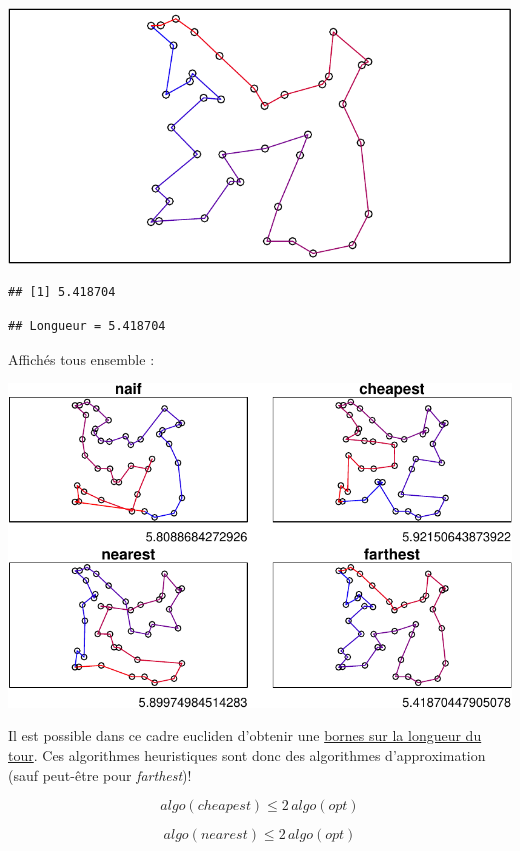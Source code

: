\documentclass[
]{article}
\begin{document}
\includegraphics{TSP_analyse_files/figure-latex/unnamed-chunk-11-1.pdf}

\begin{verbatim}
## [1] 5.418704
\end{verbatim}

\begin{verbatim}
## Longueur = 5.418704
\end{verbatim}

Affichés tous ensemble :

\includegraphics{TSP_analyse_files/figure-latex/unnamed-chunk-12-1.pdf}

Il est possible dans ce cadre eucliden d'obtenir une
\href{https://www.researchgate.net/publication/220616869_An_Analysis_of_Several_Heuristics_for_the_Traveling_Salesman_Problem}{bornes
sur la longueur du tour}. Ces algorithmes heuristiques sont donc des
algorithmes d'approximation (sauf peut-être pour \emph{farthest})!

\[algo(cheapest) \le 2 \,algo(opt)\]

\[algo(nearest) \le 2 \,algo(opt)\]
\end{document}
